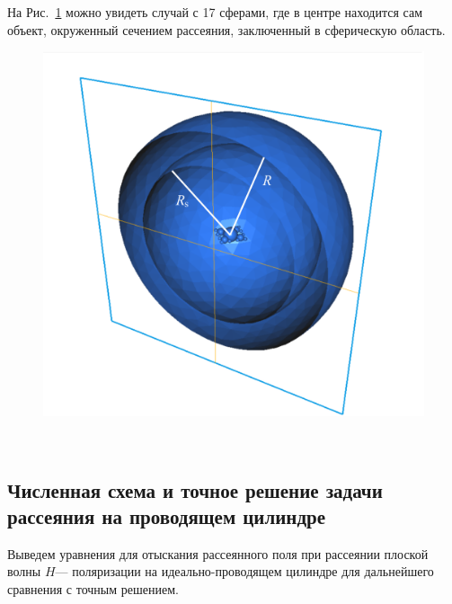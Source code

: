 На Рис.~\ref{fig:3td_scattererAndOuterSpheres} можно увидеть случай с 17 сферами, где в центре находится сам объект, окруженный сечением рассеяния, заключенный в сферическую область.\\
\begin{figure}[h!]
	\centering
	\includegraphics[width=0.6\linewidth]{3td_scattererAndOuterSpheres}
	\caption{}
	\label{fig:3td_scattererAndOuterSpheres}
\end{figure} \\






\subsection{Численная схема и точное решение задачи рассеяния на проводящем цилиндре}
Выведем уравнения для отыскания рассеянного поля при рассеянии плоской волны $H$--- поляризации на идеально-проводящем цилиндре для дальнейшего сравнения с точным решением.

